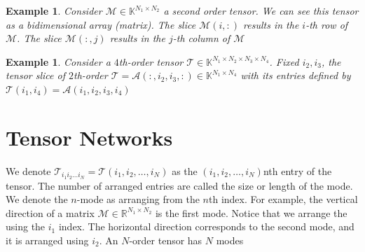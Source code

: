 \documentclass[11pt,a4paper,openright,oneside]{book}
\numberwithin{equation}{section}
\newtheorem{example0}[defn0]{Example}
\newenvironment{example}{ \begin{example0}\rm}{\end{example0}}
\begin{document}
\begin{example}
    Consider $\mathcal{M} \in \mathbb{K}^{N_1 \times N_2}$ a second order tensor. We can see this tensor as a
    bidimensional array (matrix). The slice $\mathcal{M}(i, :)$ results in the $i$-th row of $\mathcal{M}$.
    The slice $\mathcal{M}(:, j)$ results in the $j$-th column of $\mathcal{M}$
\end{example}

\begin{example}
    Consider a $4$th-order tensor $\mathcal{T} \in \mathbb{K}^{N_1 \times N_2 \times N_3 \times N_4}$. 
    Fixed $i_2, i_3$, the tensor slice of $2$th-order $\mathcal{T} = \mathcal{A}(:, i_2, i_3, :) \in \mathbb{K}^{N_1 \times N_4}$ 
    with its entries defined by ${\mathcal{T}(i_1, i_4) = \mathcal{A}(i_1, i_2, i_3, i_4)}$
\end{example}


\section{Tensor Networks}

We denote $\mathcal{T}_{i_1 i_2 \dots i_N} = \mathcal{T}(i_1, i_2, \dots, i_N)$ as the $(i_1, i_2, \dots, i_N)$nth entry of the
tensor. The number of arranged entries are called the size or length of the mode. We denote the $n$-mode as arranging from the $n$th index. For example,
the vertical direction of a matrix $\mathcal{M} \in \mathbb{R}^{N_1 \times N_2}$ is the first mode. Notice that we arrange the 
using the $i_1$ index. The horizontal direction corresponds to the second mode, and it is arranged using $i_2$. An $N$-order
tensor has $N$ modes
\end{document}
